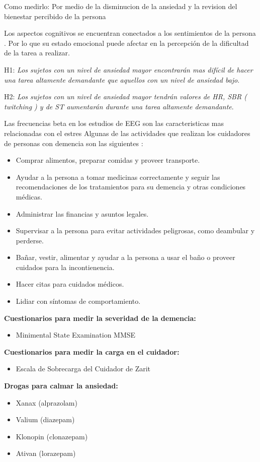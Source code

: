 \documentclass[letterpaper,12pt]{cicese}
\begin{document}
		Como medirlo: Por medio de la disminucion de la ansiedad y la revision del bienestar percibido de la persona
		
		Los aspectos cognitivos se encuentran conectados a los sentimientos de la persona \citep{Wilt2011987}. Por lo que su estado emocional puede afectar en la percepci\'on de la dificultad de la tarea a realizar.

		H1: \textit{Los sujetos con un nivel de ansiedad mayor encontrar\'an mas dif\'icil de hacer una tarea altamente demandante que aquellos con un nivel de ansiedad bajo}.
		

		H2: \textit{Los sujetos con un nivel de ansiedad mayor tendr\'an valores de HR, SBR ( twitching ) y  de ST aumentar\'an durante una tarea altamente demandante}.
		\newpage
		
		Las frecuencias beta en los estudios de EEG son las caracteristicas mas relacionadas con el estres \citep{Sharma20121287}
		Algunas de las actividades que realizan los cuidadores de personas con demencia son las siguientes \citep{tagkey2008110}: 
		\begin{itemize}
			\item Comprar alimentos, preparar comidas y proveer transporte.
			\item Ayudar a la persona a tomar medicinas correctamente y seguir las recomendaciones de los tratamientos para su demencia y otras condiciones m\'edicas.
			\item Administrar las financias y asuntos legales.
			\item Supervisar a la persona para evitar actividades peligrosas, como deambular y perderse.	
			\item Ba\~nar, vestir, alimentar y ayudar a la persona a usar el ba\~no o proveer cuidados para la incontienencia.
			\item Hacer citas para cuidados m\'edicos.
			\item Lidiar con s\'intomas de comportamiento.

		\end{itemize}
		\textbf{Cuestionarios para medir la severidad de la demencia:}
		\begin{itemize}

			\item Minimental State Examination MMSE

		\end{itemize}
		\textbf{Cuestionarios para medir la carga en el cuidador:}
		\begin{itemize}

			\item Escala de Sobrecarga del Cuidador de Zarit

		\end{itemize}
		\textbf{Drogas para calmar la ansiedad:}
		\begin{itemize}
			\item Xanax (alprazolam)
			\item Valium (diazepam)
			\item Klonopin (clonazepam)
			\item Ativan (lorazepam)
		\end{itemize}
\end{document}
